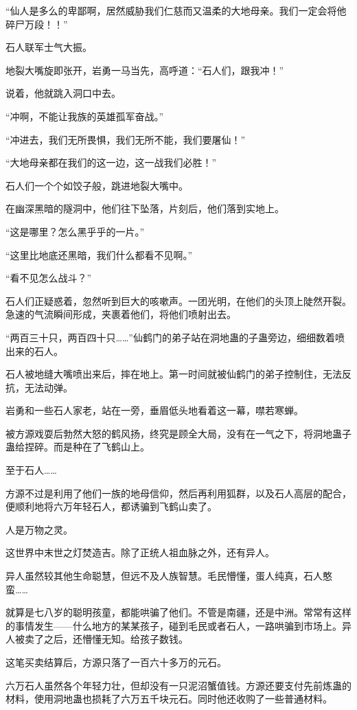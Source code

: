 \begin{this_body}
“仙人是多么的卑鄙啊，居然威胁我们仁慈而又温柔的大地母亲。我们一定会将他碎尸万段！！”

石人联军士气大振。

地裂大嘴旋即张开，岩勇一马当先，高呼道：“石人们，跟我冲！”

说着，他就跳入洞口中去。

“冲啊，不能让我族的英雄孤军奋战。”

“冲进去，我们无所畏惧，我们无所不能，我们要屠仙！”

“大地母亲都在我们的这一边，这一战我们必胜！”

石人们一个个如饺子般，跳进地裂大嘴中。

在幽深黑暗的隧洞中，他们往下坠落，片刻后，他们落到实地上。

“这是哪里？怎么黑乎乎的一片。”

“这里比地底还黑暗，我们什么都看不见啊。”

“看不见怎么战斗？”

石人们正疑惑着，忽然听到巨大的咳嗽声。一团光明，在他们的头顶上陡然开裂。急速的气流瞬间形成，夹裹着他们，将他们喷射出去。

“两百三十只，两百四十只……”仙鹤门的弟子站在洞地蛊的子蛊旁边，细细数着喷出来的石人。

石人被地缝大嘴喷出来后，摔在地上。第一时间就被仙鹤门的弟子控制住，无法反抗，无法动弹。

岩勇和一些石人家老，站在一旁，垂眉低头地看着这一幕，噤若寒蝉。

被方源戏耍后勃然大怒的鹤风扬，终究是顾全大局，没有在一气之下，将洞地蛊子蛊给捏碎。而是种在了飞鹤山上。

至于石人……

方源不过是利用了他们一族的地母信仰，然后再利用狐群，以及石人高层的配合，便顺利地将六万年轻石人，都诱骗到飞鹤山卖了。

人是万物之灵。

这世界中末世之灯焚造吉。除了正统人祖血脉之外，还有异人。

异人虽然较其他生命聪慧，但远不及人族智慧。毛民懵懂，蛋人纯真，石人憨蛮……

就算是七八岁的聪明孩童，都能哄骗了他们。不管是南疆，还是中洲。常常有这样的事情发生——什么地方的某某孩子，碰到毛民或者石人，一路哄骗到市场上。异人被卖了之后，还懵懂无知。给孩子数钱。

这笔买卖结算后，方源只落了一百六十多万的元石。

六万石人虽然各个年轻力壮，但却没有一只泥沼蟹值钱。方源还要支付先前炼蛊的材料，使用洞地蛊也损耗了六万五千块元石。同时他还收购了一些普通材料。


\end{this_body}
